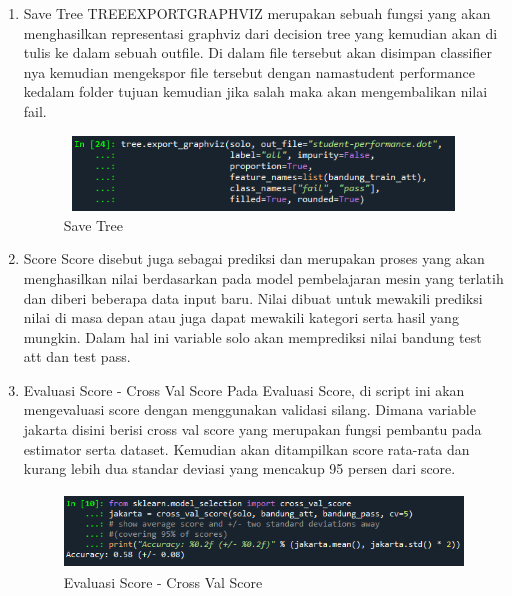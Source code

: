 \begin{enumerate}
\item Save Tree
\newline TREEEXPORTGRAPHVIZ merupakan sebuah fungsi yang akan menghasilkan representasi graphviz dari decision tree yang kemudian akan di tulis ke dalam sebuah outfile. Di dalam file tersebut akan disimpan classifier nya kemudian mengekspor file tersebut dengan namastudent performance kedalam folder tujuan kemudian jika salah maka akan mengembalikan nilai fail.
\begin{figure}[!htbp]
	\centering
	\includegraphics[width=12cm,height=2cm]{figures/save_tree.png}
	\caption{Save Tree}
	\label{penanda}
\end{figure}

\item Score
\newline Score disebut juga sebagai prediksi dan merupakan proses yang akan menghasilkan nilai berdasarkan pada model pembelajaran mesin yang terlatih dan diberi beberapa data input baru. Nilai dibuat untuk mewakili prediksi nilai di masa depan atau juga dapat mewakili kategori serta hasil yang mungkin. Dalam hal ini variable solo akan memprediksi nilai bandung test att dan test pass.

\item Evaluasi Score - Cross Val Score
\newline Pada Evaluasi Score, di script ini akan mengevaluasi score dengan menggunakan validasi silang. Dimana variable jakarta disini berisi cross val score yang merupakan fungsi pembantu pada estimator serta dataset. Kemudian akan ditampilkan score rata-rata dan kurang lebih dua standar deviasi yang mencakup 95 persen dari score.
\begin{figure}[!htbp]
	\centering
	\includegraphics[width=12cm,height=2cm]{figures/cross_val_score.png}
	\caption{Evaluasi Score - Cross Val Score}
	\label{penanda}
\end{figure}


\end{enumerate}
